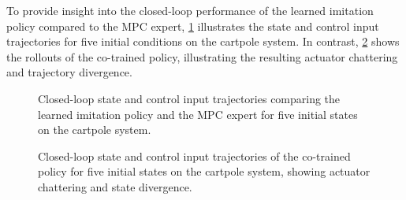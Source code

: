 To provide insight into the closed-loop performance of the learned imitation policy compared to the MPC expert, 
\cref{fig:app-cartpole-trajectories} illustrates the state and control input trajectories for 
five initial conditions on the cartpole system. 
In contrast, \cref{fig:app-cp-cotrain-trajectories} shows the rollouts of the co-trained policy, 
illustrating the resulting actuator chattering and trajectory divergence.

\begin{figure}[htbp]
    \centering
    
    \caption[Cartpole imitation learning trajectory comparison]{
        Closed-loop state and control input trajectories comparing the learned imitation policy and the MPC expert for 
        five initial states on the cartpole system.}
    \label{fig:app-cartpole-trajectories}
\end{figure}

\begin{figure}[htbp]
    \centering
    
    \caption[Cartpole co-trained policy closed-loop trajectories]{
        Closed-loop state and control input trajectories of the co-trained policy for 
        five initial states on the cartpole system, showing actuator chattering and state divergence.}
    \label{fig:app-cp-cotrain-trajectories}
\end{figure}
